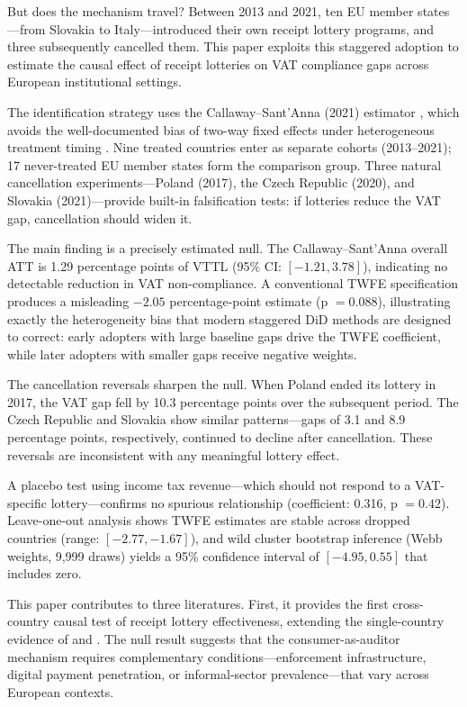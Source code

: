 \documentclass[12pt]{article}
\begin{document}
But does the mechanism travel? Between 2013 and 2021, ten EU member states---from Slovakia to Italy---introduced their own receipt lottery programs, and three subsequently cancelled them. This paper exploits this staggered adoption to estimate the causal effect of receipt lotteries on VAT compliance gaps across European institutional settings.

The identification strategy uses the Callaway--Sant'Anna (2021) estimator \citep{callaway2021}, which avoids the well-documented bias of two-way fixed effects under heterogeneous treatment timing \citep{goodman2021, sun2021, dechaisemartin2020}. Nine treated countries enter as separate cohorts (2013--2021); 17 never-treated EU member states form the comparison group. Three natural cancellation experiments---Poland (2017), the Czech Republic (2020), and Slovakia (2021)---provide built-in falsification tests: if lotteries reduce the VAT gap, cancellation should widen it.

The main finding is a precisely estimated null. The Callaway--Sant'Anna overall ATT is 1.29 percentage points of VTTL (95\% CI: $[-1.21, 3.78]$), indicating no detectable reduction in VAT non-compliance. A conventional TWFE specification produces a misleading $-2.05$ percentage-point estimate (p $= 0.088$), illustrating exactly the heterogeneity bias that modern staggered DiD methods are designed to correct: early adopters with large baseline gaps drive the TWFE coefficient, while later adopters with smaller gaps receive negative weights.

The cancellation reversals sharpen the null. When Poland ended its lottery in 2017, the VAT gap fell by 10.3 percentage points over the subsequent period. The Czech Republic and Slovakia show similar patterns---gaps of 3.1 and 8.9 percentage points, respectively, continued to decline after cancellation. These reversals are inconsistent with any meaningful lottery effect.

A placebo test using income tax revenue---which should not respond to a VAT-specific lottery---confirms no spurious relationship (coefficient: 0.316, p $= 0.42$). Leave-one-out analysis shows TWFE estimates are stable across dropped countries (range: $[-2.77, -1.67]$), and wild cluster bootstrap inference (Webb weights, 9,999 draws) yields a 95\% confidence interval of $[-4.95, 0.55]$ that includes zero.

This paper contributes to three literatures. First, it provides the first cross-country causal test of receipt lottery effectiveness, extending the single-country evidence of \citet{naritomi2019} and \citet{wan2010}. The null result suggests that the consumer-as-auditor mechanism requires complementary conditions---enforcement infrastructure, digital payment penetration, or informal-sector prevalence---that vary across European contexts.
\end{document}
